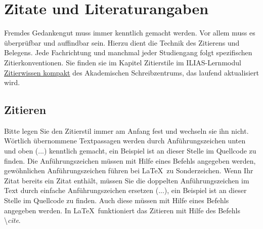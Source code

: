 \documentclass[a4paper,11pt]{article}%
\renewcommand{\\}{\vspace*{0.5\baselineskip} \newline}
\begin{document}
\section{Zitate und Literaturangaben}
Fremdes Gedankengut muss immer kenntlich gemacht werden. Vor allem muss es überprüfbar und auffindbar sein. Hierzu dient die Technik des Zitierens und Belegens.\\
Jede Fachrichtung und manchmal jeder Studiengang folgt spezifischen Zitierkonventionen. Sie finden sie im Kapitel Zitierstile im ILIAS-Lernmodul \href{https://ilias.th-koeln.de/ilias.php?baseClass=ilRepositoryGUI}{\underline{Zitierwissen kompakt}} des Akademischen Schreibzentrums, das laufend aktualisiert wird.

\subsection{Zitieren}
Bitte legen Sie den Zitierstil immer am Anfang fest und wechseln sie ihn nicht.\\
Wörtlich übernommene Textpassagen werden durch Anführungszeichen unten und oben (\glqq...\grqq) kenntlich gemacht, ein Beispiel ist an dieser Stelle im Quellcode zu finden. Die Anführungszeichen müssen mit Hilfe eines Befehls angegeben werden, gewöhnlichen Anführungszeichen führen bei \LaTeX~zu Sonderzeichen.\\
Wenn Ihr Zitat bereits ein Zitat enthält, müssen Sie die doppelten Anführungszeichen im Text durch einfache Anführungszeichen ersetzen (\glq...\grq), ein Beispiel ist an dieser Stelle im Quellcode zu finden. Auch diese müssen mit Hilfe eines Befehls angegeben werden.\\
In \LaTeX~funktioniert das Zitieren\cite[Beispielzitat aus Quelle 7]{FN} mit Hilfe des Befehls \textbackslash\textit{cite}.
\end{document}
